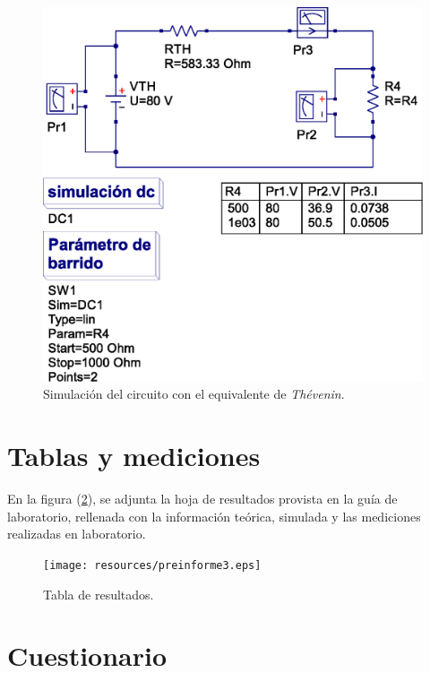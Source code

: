 \documentclass[letter,11pt]{article}
\begin{document}
\begin{figure}[!h]
\centering
\includegraphics[scale=0.64]{simulation/practica4.3.eps}
\caption{Simulación del circuito con el equivalente de \emph{Thévenin}.}
\label{simulacion3}
\end{figure}

\section{Tablas y mediciones}
En la figura (\ref{tablas}), se adjunta la hoja de resultados provista en la
guía de laboratorio, rellenada con la información teórica, simulada y las
mediciones realizadas en laboratorio.

\begin{figure}[!h]
\centering
\texttt{[image: resources/preinforme3.eps]}
\caption{Tabla de resultados.}
\label{tablas}
\end{figure}

\section{Cuestionario}
\end{document}
